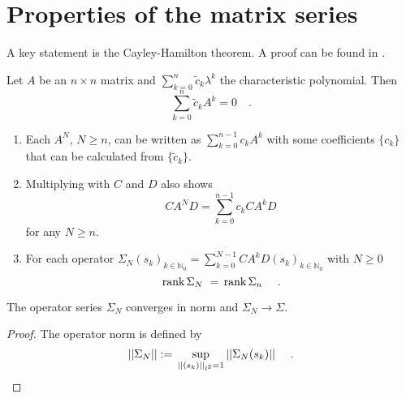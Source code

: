 \section{Properties of the matrix series}
A key statement is the Cayley-Hamilton theorem. A proof can be found in 
\cite{Greub}.
\begin{theorem}
	Let $A$ be an $n\times n$ matrix and $\sum_{k=0}^n \tilde{c}_k 
	\lambda^k $ 
	the characteristic polynomial. Then
	\begin{equation}
	\sum\limits_{k=0}^n \tilde{c}_k A^k = 0 \quad .
	\end{equation}
\end{theorem}
\begin{corollary}
	\begin{enumerate}
	\item Each $A^N$, $N\geq n$, can be written as $\sum_{k=0}^{n-1} 
	c_k A^k$ with some coefficients $\{c_k\}$ that can be 
	calculated from $\{\tilde{c}_k\}$.
	\item Multiplying with $C$ and $D$ also shows 
	\begin{equation}
	CA^ND = \sum\limits_{k=0}^{n-1} c_k C A^k D
	\end{equation}
	for any $N\geq n$.
	\item For each operator $\Sigma_N (s_k)_{k\in\mathbb{N}_0}= \sum_{k=0}^{N-1} CA^kD 
	(s_k)_{k\in\mathbb{N}_0} $ with $N
	\geq 0$ 
	\begin{equation}
	\rank{\Sigma_N} = \rank{\Sigma_n} \quad .
	\end{equation}	 
	\end{enumerate}
\end{corollary}
\begin{lemma}
	The operator series $\Sigma_N$ converges in norm and $\Sigma_N \longrightarrow \Sigma
	$.
\end{lemma}
\begin{proof}
	The operator norm is defined by
	\begin{equation}
	||\Sigma_N|| := \supremum{|| \Sigma_N (s_k) ||}{||(s_k)||_{l^2} = 1} \quad .
	\end{equation}
\end{proof}


